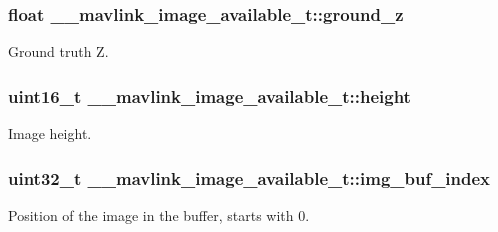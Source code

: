 \hypertarget{struct____mavlink__image__available__t_a1841e4a3c1e6cdbcdd768040e336b790}{
\subsubsection[{ground\+\_\+z}]{\setlength{\rightskip}{0pt plus 5cm}float \+\_\+\+\_\+mavlink\+\_\+image\+\_\+available\+\_\+t\+::ground\+\_\+z}}\label{struct____mavlink__image__available__t_a1841e4a3c1e6cdbcdd768040e336b790}


Ground truth Z. 

\hypertarget{struct____mavlink__image__available__t_a09e859dfd3fa5fc9a08e9d4e042cbd85}{
\subsubsection[{height}]{\setlength{\rightskip}{0pt plus 5cm}uint16\+\_\+t \+\_\+\+\_\+mavlink\+\_\+image\+\_\+available\+\_\+t\+::height}}\label{struct____mavlink__image__available__t_a09e859dfd3fa5fc9a08e9d4e042cbd85}


Image height. 

\hypertarget{struct____mavlink__image__available__t_af983c6207a4062b08e9f99e889fde124}{
\subsubsection[{img\+\_\+buf\+\_\+index}]{\setlength{\rightskip}{0pt plus 5cm}uint32\+\_\+t \+\_\+\+\_\+mavlink\+\_\+image\+\_\+available\+\_\+t\+::img\+\_\+buf\+\_\+index}}\label{struct____mavlink__image__available__t_af983c6207a4062b08e9f99e889fde124}


Position of the image in the buffer, starts with 0. 

